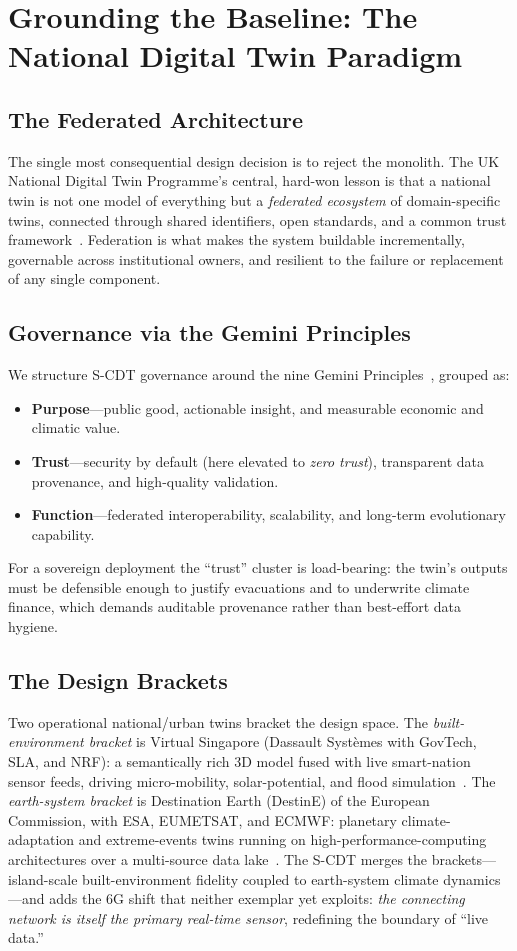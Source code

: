 \documentclass[10pt,twocolumn]{article}
\begin{document}
\section{Grounding the Baseline: The National Digital Twin Paradigm}
\label{sec:baseline}

\subsection{The Federated Architecture}
The single most consequential design decision is to reject the monolith. The UK
National Digital Twin Programme's central, hard-won lesson is that a national
twin is not one model of everything but a \emph{federated ecosystem} of
domain-specific twins, connected through shared identifiers, open standards, and
a common trust framework~\cite{ndtp,gemini}. Federation is what makes the system
buildable incrementally, governable across institutional owners, and resilient
to the failure or replacement of any single component.

\subsection{Governance via the Gemini Principles}
We structure S-CDT governance around the nine Gemini
Principles~\cite{gemini}, grouped as:
\begin{itemize}
\item \textbf{Purpose}---public good, actionable insight, and measurable
economic and climatic value.
\item \textbf{Trust}---security by default (here elevated to \emph{zero trust}),
transparent data provenance, and high-quality validation.
\item \textbf{Function}---federated interoperability, scalability, and long-term
evolutionary capability.
\end{itemize}
For a sovereign deployment the ``trust'' cluster is load-bearing: the twin's
outputs must be defensible enough to justify evacuations and to underwrite
climate finance, which demands auditable provenance rather than best-effort
data hygiene.

\subsection{The Design Brackets}
Two operational national/urban twins bracket the design space. The
\emph{built-environment bracket} is Virtual Singapore (Dassault Syst\`emes with
GovTech, SLA, and NRF): a semantically rich 3D model fused with live smart-nation
sensor feeds, driving micro-mobility, solar-potential, and flood
simulation~\cite{vsg}. The \emph{earth-system bracket} is Destination Earth
(DestinE) of the European Commission, with ESA, EUMETSAT, and ECMWF: planetary
climate-adaptation and extreme-events twins running on high-performance-computing
architectures over a multi-source data lake~\cite{destine}. The S-CDT merges the
brackets---island-scale built-environment fidelity coupled to earth-system
climate dynamics---and adds the 6G shift that neither exemplar yet exploits:
\emph{the connecting network is itself the primary real-time sensor}, redefining
the boundary of ``live data.''
\end{document}
